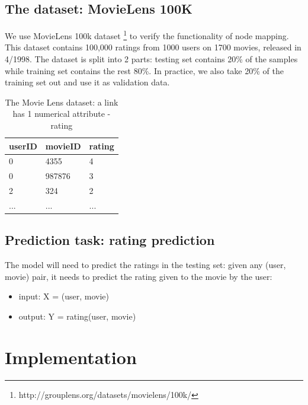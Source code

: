 \documentclass{article}
\begin{document}
\subsection{The dataset: MovieLens 100K}
We use MovieLens 100k dataset \cite{harper2015movielens} 
\footnote{http://grouplens.org/datasets/movielens/100k/} to verify the 
functionality of node mapping. This dataset contains 100,000 ratings from 1000 
users on 1700 movies, released in 4/1998. The dataset is split into 2 parts: 
testing set contains 20\% of the samples while training set contains the rest 
80\%. In practice, we also take 20\% of the training set out and use it as 
validation data.
\begin{table}[H]
	\centering
	\begin{tabularx}{0.5\textwidth}{|X|X|X| }  \hline
		userID & movieID & rating \\ \hline
		0 & 4355 & 4 \\ \hline
		0 & 987876 & 3 \\ \hline
		2 & 324 & 2 \\ \hline
		... & ... & ... \\ \hline
	\end{tabularx}
	\caption{The Movie Lens dataset: a link has 1 numerical attribute - rating}
	\label{tab:rating}
\end{table}

\subsection{Prediction task: rating prediction}
The model will need to predict the ratings in the testing set: given any (user, 
movie) pair, it needs to predict the rating given to the movie by the user:
\begin{itemize}
	\item input: X = (user, movie)
	\item output: Y = rating(user, movie)
\end{itemize}

\section{Implementation}
\end{document}
